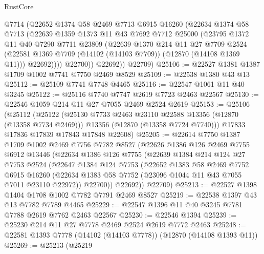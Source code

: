 \begin{lexlean}{RustCore}
\begin{coremodule}
            @7714
            (@22652
              @1374
              @58
              @2469
              @7713
              @6915
              @16260
              (@22634
                @1374
                @58
                @7713
                (@22639
                  @1359
                  @1373
                  @11
                  @43
                  @7692
                  @7712
                  @25000
                  (@23795
                    @1372
                    @11
                    @40
                    @7290
                    @7711
                    @23809
                    (@22639
                      @1370
                      @214
                      @11
                      @27
                      @7709
                      @2524
                      (@22581 @1369 @7709 (@14102 (@14103 @7709)) (@12870 (@14108 @1369 @11)))
                      @22692))))
              @22700))
          @22692))
      @22709)
@25106 := @22527 @1381 @1387 @1709 @1002 @7741 @7750 @2469 @8529
@25109 := @22538 @1380 @43 @13
@25112 := @25109 @7741 @7748 @4465
@25116 := @22547 @1061 @11 @40 @3245
@25122 := @25116 @7740 @7747 @2619 @7723 @2463 @22567
@25130 := @22546 @1059 @214 @11 @27 @7055 @2469 @2524 @2619
@25153 := @25106
    (@25112
      (@25122
        (@25130 @7733 @2463 @23110 @22588 @13356 (@12870 (@13358 @7734 @2469)))
        @13356
        (@12870 (@13358 @7724 @7740)))
      @17833
      @17836
      @17839
      @17843
      @17848
      @22608)
@25205 := @22614
    @7750
    @1387
    @1709
    @1002
    @2469
    @7756
    @7782
    @8527
    (@22626
      @1386
      @126
      @2469
      @7755
      @6912
      @13446
      (@22634
        @1386
        @126
        @7755
        (@22639
          @1384
          @214
          @124
          @27
          @7753
          @2524
          (@22647
            @1384
            @124
            @7753
            (@22652
              @1383
              @58
              @2469
              @7752
              @6915
              @16260
              (@22634 @1383 @58 @7752 (@23096 @1044 @11 @43 @7055 @7011 @23110 @22972))
              @22700))
          @22692))
      @22709)
@25213 := @22527 @1398 @1404 @1708 @1002 @7782 @7791 @2469 @8527
@25219 := @22538 @1397 @43 @13 @7782 @7789 @4465
@25229 := @22547 @1396 @11 @40 @3245 @7781 @7788 @2619 @7762 @2463 @22567
@25230 := @22546 @1394
@25239 := @25230 @214 @11 @27 @7778 @2469 @2524 @2619 @7772 @2463
@25248 := @22581 @1393 @7778 (@14102 (@14103 @7778)) (@12870 (@14108 @1393 @11))
@25269 := @25213
    (@25219

\end{coremodule}
\end{lexlean}
